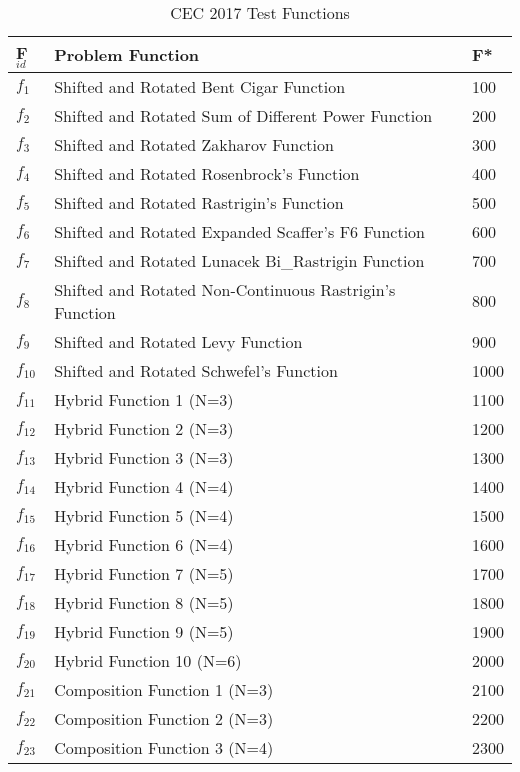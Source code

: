 \begin{table}[!htbp]
\caption{CEC 2017 Test Functions}
\vspace{-3mm}
\centering
\begin{tabular}{|p{0.5cm}|p{5.4cm}|p{0.6cm}|}
\hline
F$_{id}$ & Problem Function & F* \\ \hline
$f_{1}$ & Shifted and Rotated Bent Cigar Function & 100 \\
\hline
$f_{2}$ & Shifted and Rotated Sum of Different Power Function & 200 \\
\hline
$f_{3}$ & Shifted and Rotated Zakharov Function & 300\\
\hline
$f_{4}$ & Shifted and Rotated Rosenbrock's Function & 400\\
\hline
$f_{5}$ & Shifted and Rotated Rastrigin's Function & 500\\
\hline
$f_{6}$ & Shifted and Rotated Expanded Scaffer's F6 Function & 600\\
\hline
$f_{7}$ & Shifted and Rotated Lunacek Bi\_Rastrigin Function & 700\\
\hline
$f_{8}$ & Shifted and Rotated Non-Continuous Rastrigin's Function & 800\\
\hline
$f_{9}$ & Shifted and Rotated Levy Function & 900\\
\hline
$f_{10}$ & Shifted and Rotated Schwefel's Function & 1000\\
\hline
$f_{11}$ & Hybrid Function 1 (N=3) & 1100\\
\hline
$f_{12}$ & Hybrid Function 2 (N=3) & 1200\\
\hline
$f_{13}$ & Hybrid Function 3 (N=3) & 1300\\
\hline
$f_{14}$ & Hybrid Function 4 (N=4) & 1400\\
\hline
$f_{15}$ & Hybrid Function 5 (N=4) & 1500\\
\hline
$f_{16}$ & Hybrid Function 6 (N=4) & 1600\\
\hline
$f_{17}$ & Hybrid Function 7 (N=5) & 1700\\
\hline
$f_{18}$ & Hybrid Function 8 (N=5) & 1800\\
\hline
$f_{19}$ & Hybrid Function 9 (N=5) & 1900\\
\hline
$f_{20}$ & Hybrid Function 10 (N=6) & 2000\\
\hline
$f_{21}$ & Composition Function 1 (N=3) & 2100\\
\hline
$f_{22}$ & Composition Function 2 (N=3) & 2200\\
\hline
$f_{23}$ & Composition Function 3 (N=4) & 2300\\

\end{tabular}
\end{table}
